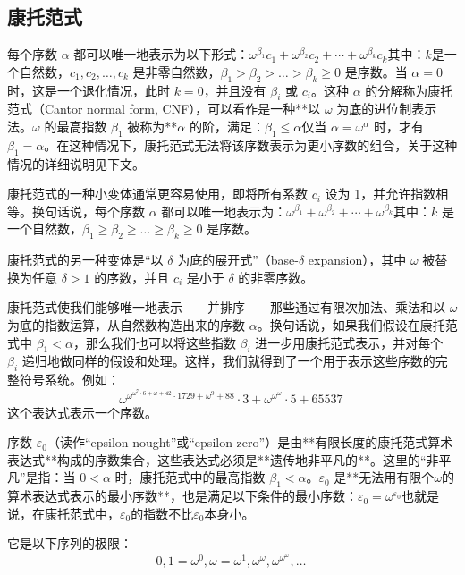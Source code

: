 \subsection{康托范式} 
每个序数 \(\alpha\) 都可以唯一地表示为以下形式：\(\omega^{\beta_1} c_1 + \omega^{\beta_2} c_2 + \cdots + \omega^{\beta_k} c_k\)其中：\(k\)是一个自然数，\(c_1, c_2, \dots, c_k\) 是非零自然数，\(\beta_1 > \beta_2 > \dots > \beta_k \geq 0\) 是序数。当 \(\alpha = 0\) 时，这是一个退化情况，此时 \(k = 0\)，并且没有 \(\beta_i\) 或 \(c_i\)。这种 \(\alpha\) 的分解称为康托范式（Cantor normal form, CNF），可以看作是一种**以 \(\omega\) 为底的进位制表示法。\(\omega\) 的最高指数 \(\beta_1\) 被称为**\(\alpha\) 的阶，满足：\(\beta_1 \leq \alpha\)仅当 \(\alpha = \omega^\alpha\) 时，才有 \(\beta_1 = \alpha\)。在这种情况下，康托范式无法将该序数表示为更小序数的组合，关于这种情况的详细说明见下文。

康托范式的一种小变体通常更容易使用，即将所有系数 \(c_i\) 设为 1，并允许指数相等。换句话说，每个序数 \(\alpha\) 都可以唯一地表示为：\(\omega^{\beta_1} + \omega^{\beta_2} + \cdots + \omega^{\beta_k}\)其中：\(k\) 是一个自然数，\(\beta_1 \geq \beta_2 \geq \dots \geq \beta_k \geq 0\) 是序数。

康托范式的另一种变体是“以 \(\delta\) 为底的展开式”（base-\(\delta\) expansion），其中 \(\omega\) 被替换为任意 \(\delta > 1\) 的序数，并且 \(c_i\) 是小于 \(\delta\) 的非零序数。

康托范式使我们能够唯一地表示——并排序——那些通过有限次加法、乘法和以 \(\omega\) 为底的指数运算，从自然数构造出来的序数 \(\alpha\)。换句话说，如果我们假设在康托范式中 \(\beta_1 < \alpha\)，那么我们也可以将这些指数 \(\beta_i\) 进一步用康托范式表示，并对每个 \(\beta_i\) 递归地做同样的假设和处理。这样，我们就得到了一个用于表示这些序数的完整符号系统。例如：
\[
\omega^{\omega^{\omega^7 \cdot 6 + \omega + 42} \cdot 1729 + \omega^9 + 88} \cdot 3 + \omega^{\omega^{\omega}} \cdot 5 + 65537~
\]
这个表达式表示一个序数。

序数 \(\varepsilon_0\)（读作“epsilon nought”或“epsilon zero”）是由**有限长度的康托范式算术表达式**构成的序数集合，这些表达式必须是**遗传地非平凡的**。这里的“非平凡”是指：当 \(0 < \alpha\) 时，康托范式中的最高指数 \(\beta_1 < \alpha\)。\(\varepsilon_0\) 是**无法用有限个\(\omega\)的算术表达式表示的最小序数**，也是满足以下条件的最小序数：\(\varepsilon_0 = \omega^{\varepsilon_0}\)也就是说，在康托范式中，\(\varepsilon_0\)的指数不比\(\varepsilon_0\)本身小。

它是以下序列的极限：
\[
0, 1 = \omega^0, \omega = \omega^1, \omega^\omega, \omega^{\omega^\omega}, \dots~
\]
